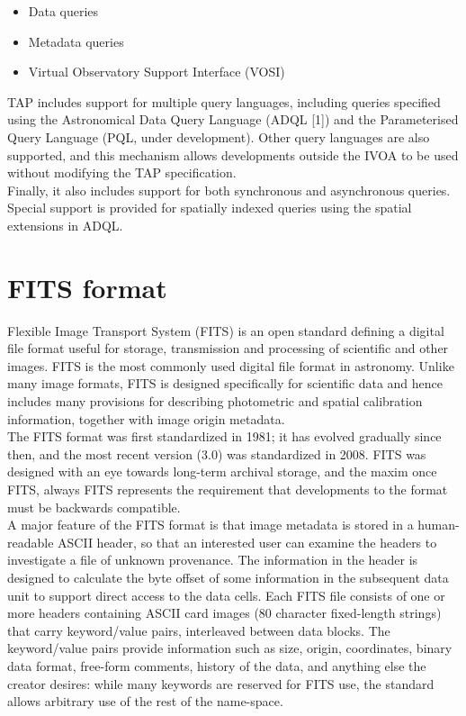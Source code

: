\begin{itemize}
\item Data queries
\item Metadata queries
\item Virtual Observatory Support Interface (VOSI)
\end{itemize}


TAP includes support for multiple query languages, including queries specified using the Astronomical Data Query Language (ADQL [1]) and the Parameterised Query Language (PQL, under development). Other query languages are also supported, and this mechanism allows developments outside the IVOA to be used without modifying the TAP specification.\\

Finally, it also includes support for both synchronous and asynchronous queries. Special support is provided for spatially indexed queries using the spatial extensions in ADQL.\\

\section{FITS format}
 
Flexible Image Transport System (FITS) is an open standard defining a digital file format useful for storage, transmission and processing of scientific and other images. FITS is the most commonly used digital file format in astronomy. Unlike many image formats, FITS is designed specifically for scientific data and hence includes many provisions for describing photometric and spatial calibration information, together with image origin metadata.\\

The FITS format was first standardized in 1981; it has evolved gradually since then, and the most recent version (3.0) was standardized in 2008. FITS was designed with an eye towards long-term archival storage, and the maxim once FITS, always FITS represents the requirement that developments to the format must be backwards compatible.\\
 
A major feature of the FITS format is that image metadata is stored in a human-readable ASCII header, so that an interested user can examine the headers to investigate a file of unknown provenance. The information in the header is designed to calculate the byte offset of some information in the subsequent data unit to support direct access to the data cells. Each FITS file consists of one or more headers containing ASCII card images (80 character fixed-length strings) that carry keyword/value pairs, interleaved between data blocks. The keyword/value pairs provide information such as size, origin, coordinates, binary data format, free-form comments, history of the data, and anything else the creator desires: while many keywords are reserved for FITS use, the standard allows arbitrary use of the rest of the name-space.\\
 
